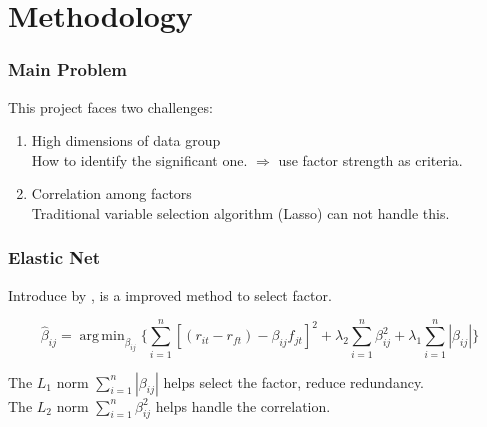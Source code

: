 \documentclass[12pt]{beamer}
\DeclareMathOperator*{\argmin}{arg\,min}
\begin{document}
	\section{Methodology}

\begin{frame}
\frametitle{Main Problem}
This project faces two challenges:
\begin{enumerate}
\item	 High dimensions of data group\\
How to identify the significant one. $\Rightarrow$ \alert{use factor strength as criteria.}
\item 	Correlation among factors \\
Traditional variable selection algorithm (Lasso) can not handle this.
\end{enumerate}
\end{frame}

	
\begin{frame}
\frametitle{Elastic Net}
Introduce by , is a improved method to select factor.

	\[   \hat{\beta}_{ij}  = \argmin_{\beta_{ij}}\{\sum_{i = 1}^{n}[(r_{it} - r_{ft}) - \beta_{ij }f_{jt}]^2 + \lambda_2\sum_{i = 1}^{n}\beta_{ij}^2  + \lambda_1\sum_{i = 1}^{n}|\beta_{ij}|     \}    \]
	
	The $L_1$ norm $\sum_{i = 1}^{n}|\beta_{ij}|$ helps select the factor, reduce redundancy.\\
    The $L_2$ norm $\sum_{i = 1}^{n}\beta_{ij}^2 $ helps handle the correlation.

\end{frame}


\end{document}

